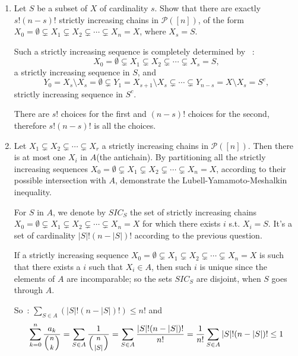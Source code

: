 \documentclass[a4paper,11pt]{exam}
\renewcommand{\binom}{\mbinom}
\begin{document}
\begin{questions}
\begin{enumerate}
\begin{enumerate}
				\item Let $ S $ be a subset of $ X $ of cardinality $ s $. Show that there are exactly $ s! (n-s)!$ strictly increasing chains in $ \mathcal{P}([n])$, of the form $X_0 = \emptyset \subsetneq X_1 \subsetneq X_2
				\subsetneq \cdots \subsetneq X_n=X$, where $X_s = S$.
				
				\begin{solution}
					Such a strictly increasing sequence is completely determined by ~:
					$$X_0 = \emptyset \subsetneq X_1 \subsetneq X_2 \subsetneq
					\cdots \subsetneq X_s=S,$$
					a strictly increasing sequence in $S$, and 
					$$Y_0 = X_s \setminus X_s = \emptyset \subsetneq Y_1 =
					X_{s+1} \setminus X_s \subsetneq \cdots \subsetneq Y_{n-s} =
					X \setminus X_s = S^c,$$
					strictly increasing sequence in $S^c$.
					
					There are $s!$ choices for the first and $(n-s)!$ choices for the second, therefore $s!(n-s)!$ is all the choices.
				\end{solution}
				
				\item Let $X_1 \subsetneq X_2 \subsetneq \cdots \subsetneq X_r$ a strictly increasing chains in $  \mathcal{P}([n]) $.
				Then there is at most one $X_i$ in $A$(the antichain). By partitioning all the strictly increasing sequences $X_0 = \emptyset \subsetneq X_1
				\subsetneq X_2 \subsetneq \cdots \subsetneq X_n=X$, according to their possible intersection with $ A $, demonstrate the Lubell-Yamamoto-Meshalkin inequality.
				
				\begin{solution}
					For $S$ in $A$, we denote by $SIC_S$ the set of strictly increasing chains $X_0 = \emptyset \subsetneq X_1 \subsetneq X_2
					\subsetneq \cdots \subsetneq X_n=X$ for which there exists $i$ s.t. $X_i=S$.
					It's a set of cardinality $|S|!(n-|S|)!$ according to the previous question.
					
					If a strictly increasing sequence  $X_0 = \emptyset
					\subsetneq X_1 \subsetneq X_2 \subsetneq \cdots \subsetneq X_n=X$
					is such that there exists a $ i $ such that $ X_i \in A $, then such $ i $ is unique since the elements of $ A $ are incomparable; so the sets $ SIC_S $ are disjoint, when $ S $ goes through $ A $.
					
					So~: $\sum_{S \in A} (|S|!(n-|S|)!) \leq n!$ and 
					\[
					\sum_{k=0}^n \frac{a_k}{\binom{n}{k}} = 
					\sum_{S \in A} \frac{1}{\binom{n}{|S|}} = 
					\sum_{S \in A} \frac{|S|!(n-|S|)!}{n!} =
					\frac{1}{n!} \sum_{S \in A} |S|!(n-|S|)! \leq 1
					\]
				\end{solution}
			\end{enumerate}
			

\end{enumerate}
\end{questions}
\end{document}
